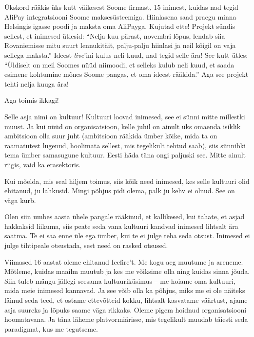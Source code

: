 Ükskord rääkis üks kutt väikesest 
Soome firmast, 15 inimest, kuidas nad tegid AliPay integratsiooni Soome 
maksesüsteemiga. Hiinlasena saad praegu minna Helsingis igasse poodi ja 
maksta oma AliPayga. Kujutad ette! Projekt sündis sellest, et inimesed 
ütlesid: \enquote{Nelja kuu pärast, novembri lõpus, lendab siia 
Rovaniemisse mitu suurt lennukitäit, palju-palju 
hiinlasi ja neil kõigil on vaja sellega maksta.} Ideest 
\emph{live}'ini kulus neli kuud, nad tegid selle ära! See kutt ütles: \enquote{Üldiselt on 
meil Soomes nüüd niimoodi, et selleks kulub neli kuud, et saada esimene kohtumine mõnes Soome pangas, et oma 
ideest rääkida.} Aga see projekt tehti nelja kuuga ära!


Aga toimis ikkagi! 


Selle asja nimi on kultuur! Kultuuri loovad inimesed, see ei sünni mitte 
millestki muust. Ja kui nüüd on organisatsioon, kelle juhil on ainult üks omaenda isiklik ambitsioon 
olla suur juht (ambitsioon rääkida ümber kõike, mida ta on raamatutest lugenud, 
hoolimata sellest, mis tegelikult tehtud saab), siis sünnibki tema ümber 
samasugune kultuur. Eesti häda täna ongi paljuski see. Mitte ainult 
riigis, vaid ka erasektoris. 


Kui mõelda, mis seal hiljem toimus, siis kõik need inimesed, kes selle 
kultuuri olid ehitanud, ju lahkusid. Mingi põhjus pidi olema, palk ju kehv ei olnud. See on väga kurb.

Olen siin umbes aasta ühele pangale rääkinud, et 
kallikesed, kui tahate, et asjad hakkaksid liikuma, siis peate seda 
vana kultuuri kandvad inimesed lihtsalt ära saatma. Te ei saa enne üle ega 
ümber, kui te ei julge teha seda otsust. Inimesed ei julge tihtipeale 
otsustada, sest need on rasked otsused. 


Viimased 16 aastat oleme ehitanud Icefire't. Me kogu aeg muutume ja areneme. Mõtleme, kuidas 
maailm muutub ja kes me võiksime olla ning kuidas sinna jõuda. Siin tuleb mängu jällegi seesama kultuuriküsimus -- me hoiame oma 
kultuuri, mida meie inimesed kannavad. Ja see võib olla ka põhjus, miks 
me ei ole näiteks läinud seda teed, et ostame ettevõtteid kokku, 
lihtsalt kasvatame väärtust, ajame asja suureks ja lõpuks saame väga rikkaks. Oleme 
pigem hoidnud organisatsiooni hoomatavana. Ja täna läheme platvormiärisse, mis tegelikult muudab täiesti seda paradigmat, kus me tegutseme. 

